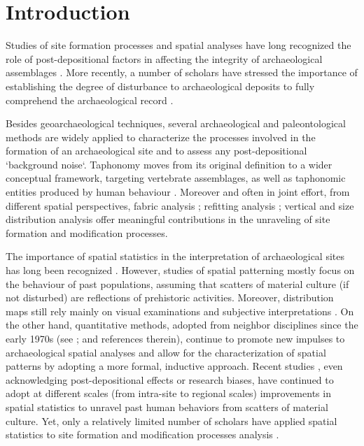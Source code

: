 \documentclass[review,authoryear]{elsarticle} %
\begin{document}
\linenumbers

\section{Introduction}

Studies of site formation processes and spatial analyses have long recognized the role of post-depositional factors in affecting the integrity of archaeological assemblages \citep{Hodder1976,Petraglia1987,Schick1984,Schick1986,Schiffer1972,Schiffer1983,Schiffer1987,Wood1978}. More recently, a number of scholars have stressed the importance of establishing the degree of disturbance to archaeological deposits to fully comprehend the archaeological record \citep{Dibble1997,Djindjian1999,Texier2000}.

Besides geoarchaeological techniques, several archaeological and paleontological methods are widely applied to characterize the processes involved in the formation of an archaeological site and to assess any post-depositional `background noise`. Taphonomy moves from its original definition \citep{Efremov1940} to a wider conceptual framework, targeting vertebrate assemblages, as well as taphonomic entities produced by human behaviour \citep{Dominguez-Rodrigo2011}. Moreover and often in joint effort, from different spatial perspectives, fabric analysis \citep{Benito-Calvo2011,Bernatchez2010,Bertran1997,Bertran1995,Dominguez-Rodrigo2014,Lenoble2004,McPherron2005,Torre2013a}; refitting analysis \citep{Lopez-Ortega2011,Sisk2008,Villa1982}; vertical \citep{Anderson2008} and size distribution analysis \citep{Bertran2006,Bertran2012,Petraglia1994} offer meaningful contributions in the unraveling of site formation and modification processes.

The importance of spatial statistics in the interpretation of archaeological sites has long been recognized \citep{Hodder1976,Whallon1974}. However, studies of spatial patterning mostly focus on the behaviour of past populations, assuming that scatters of material culture (if not disturbed) are reflections of prehistoric activities. Moreover, distribution maps still rely mainly on visual examinations and subjective interpretations \citep{Bevan2013a}. On the other hand, quantitative methods, adopted from neighbor disciplines since the early 1970s (see \cite{Hodder1976,Orton1982}; and references therein), continue to promote new impulses to archaeological spatial analyses and allow for the characterization of spatial patterns by adopting a more formal, inductive approach. Recent studies \citep{Bevan2006,Bevan2009,Bevan2013c,Bevan2013a,Bevan2013,Crema2015,Crema2010,Crema2013,Eve2014,Orton2004}, even acknowledging post-depositional effects or research biases, have continued to adopt at different scales (from intra-site to regional scales) improvements in spatial statistics to unravel past human behaviors from scatters of material culture. Yet, only a relatively limited number of scholars have applied spatial statistics to site formation and modification processes analysis \citep{Carrer2015,Dominguez-Rodrigo2014b,Dominguez-Rodrigo2014c}.
\end{document}
